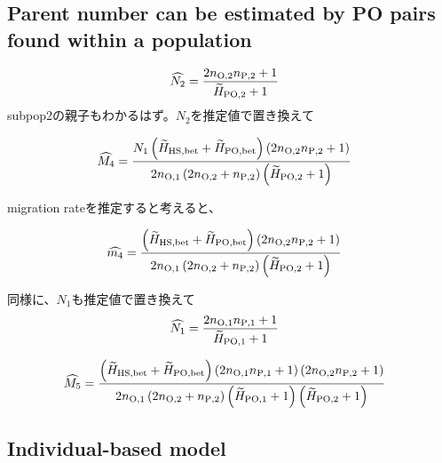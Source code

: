 \documentclass[12pt, English]{article}
\begin{document}
\begin{spacing}{1.9}
\subsection{Parent number can be estimated by PO pairs found within a population}

\begin{align}
\widehat{N_2} &= \frac{ 2 n_{\rm O, 2} n_{\rm P, 2} + 1 }{\widetilde{H}_{\rm PO, 2} + 1} 
\label{AP-3}
\end{align}
subpop2の親子もわかるはず。$N_2$を推定値で置き換えて

\begin{align}
\widehat{M_4} &=  \frac{ N_{1} \left(\widetilde{H}_{\rm HS,bet} + \widetilde{H}_{\rm PO,bet}\right) \left(2 n_{\rm O, 2} n_{\rm P, 2} + 1\right)} {2n_{\rm O, 1} \left(2 n_{\rm O, 2} + n_{\rm P, 2}\right) \left(\widetilde{H}_{\rm PO, 2} + 1\right)}
\label{AP-4}
\end{align}

migration rateを推定すると考えると、

\begin{align}
\widehat{m_4} &=  \frac{ \left(\widetilde{H}_{\rm HS,bet} + \widetilde{H}_{\rm PO,bet}\right) \left(2 n_{\rm O, 2} n_{\rm P, 2} + 1\right)} {2n_{\rm O, 1} \left(2 n_{\rm O, 2} + n_{\rm P, 2}\right) \left(\widetilde{H}_{\rm PO, 2} + 1\right)}
\label{AP-5}
\end{align}

同様に、$N_1$も推定値で置き換えて
\begin{align}
\widehat{N_1} &= \frac{ 2 n_{\rm O, 1} n_{\rm P, 1} + 1 }{\widetilde{H}_{\rm PO, 1} + 1} 
\label{AP-6}
\end{align}

\begin{align}
\widehat{M_5} &=  \frac{ \left(\widetilde{H}_{\rm HS,bet} + \widetilde{H}_{\rm PO,bet}\right) \left(2 n_{\rm O, 1} n_{\rm P, 1} + 1\right) \left(2 n_{\rm O, 2} n_{\rm P, 2} + 1\right)} {2n_{\rm O, 1} \left(2 n_{\rm O, 2} + n_{\rm P, 2}\right) \left(\widetilde{H}_{\rm PO, 1} + 1\right) \left(\widetilde{H}_{\rm PO, 2} + 1\right)}
\label{AP-7}
\end{align}

\subsection{Individual-based model}


\end{spacing}
\end{document}
